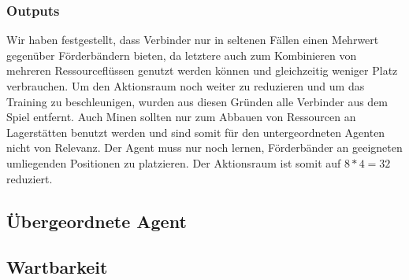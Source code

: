 \subsubsection{Outputs}
Wir haben festgestellt, dass Verbinder nur in seltenen Fällen einen Mehrwert gegenüber Förderbändern bieten, da letztere auch zum Kombinieren von mehreren Ressourceflüssen genutzt werden können und gleichzeitig weniger Platz verbrauchen. 
Um den Aktionsraum noch weiter zu reduzieren und um das Training zu beschleunigen, wurden aus diesen Gründen alle Verbinder aus dem Spiel entfernt. Auch Minen sollten nur zum Abbauen von Ressourcen an Lagerstätten benutzt werden und sind somit für den untergeordneten Agenten nicht von Relevanz. Der Agent muss nur noch lernen, Förderbänder an geeigneten umliegenden Positionen zu platzieren. Der Aktionsraum ist somit auf $8 * 4 = 32$ reduziert.

\subsection{Übergeordnete Agent}
\subsection{Wartbarkeit}
